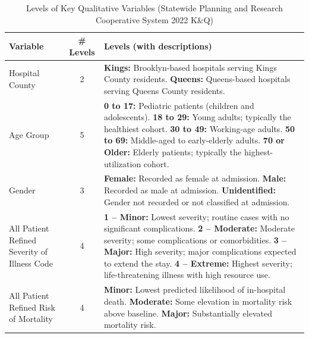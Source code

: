 \documentclass[12pt]{article}
\begin{document}
\begin{table}[H]
\centering
\caption{Levels of Key Qualitative Variables (Statewide Planning and Research Cooperative System 2022 K\&Q)}
\label{tab:levels}
\renewcommand{\arraystretch}{1.15}
\begin{tabular}{p{} c p{}}
\toprule
\textbf{Variable} & \textbf{\# Levels} & \textbf{Levels (with descriptions)} \\
\midrule
Hospital County & 2 &
\textbf{Kings:} Brooklyn-based hospitals serving Kings County residents.
\newline
\textbf{Queens:} Queens-based hospitals serving Queens County residents. \\
\midrule
Age Group & 5 &
\textbf{0 to 17:} Pediatric patients (children and adolescents).
\newline
\textbf{18 to 29:} Young adults; typically the healthiest cohort.
\newline
\textbf{30 to 49:} Working-age adults.
\newline
\textbf{50 to 69:} Middle-aged to early-elderly adults.
\newline
\textbf{70 or Older:} Elderly patients; typically the highest-utilization cohort. \\
\midrule
Gender & 3 &
\textbf{Female:} Recorded as female at admission.
\newline
\textbf{Male:} Recorded as male at admission.
\newline
\textbf{Unidentified:} Gender not recorded or not classified at admission. \\
\midrule
All Patient Refined Severity of Illness Code & 4 &
\textbf{1 -- Minor:} Lowest severity; routine cases with no significant complications.
\newline
\textbf{2 -- Moderate:} Moderate severity; some complications or comorbidities.
\newline
\textbf{3 -- Major:} High severity; major complications expected to extend the stay.
\newline
\textbf{4 -- Extreme:} Highest severity; life-threatening illness with high resource use. \\
\midrule
All Patient Refined Risk of Mortality & 4 &
\textbf{Minor:} Lowest predicted likelihood of in-hospital death.
\newline
\textbf{Moderate:} Some elevation in mortality risk above baseline.
\newline
\textbf{Major:} Substantially elevated mortality risk.
\newline

\end{tabular}
\end{table}
\end{document}
